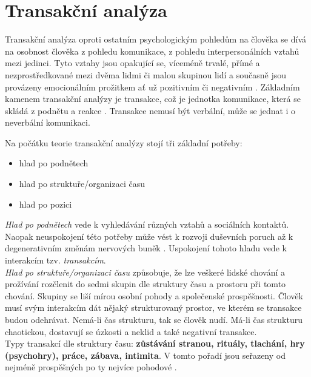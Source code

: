 \chapter{Transakční analýza}

Transakční analýza oproti ostatním psychologickým pohledům na
člověka se dívá na osobnost člověka z pohledu komunikace, 
z pohledu interpersonálních vztahů mezi jedinci. 
Tyto vztahy jsou opakující se, víceméně trvalé, přímé a 
nezprostředkované mezi dvěma lidmi či malou skupinou lidí a 
současně jsou provázeny emocionálním prožitkem ať už pozitivním či negativním \cite{interpersonalni_vztahy_slovnik}. Základním kamenem transakční analýzy je transakce, což je jednotka komunikace, která se skládá z podnětu a reakce \cite{transakcni_analyza_cata}. Transakce nemusí být verbální, může se jednat i o neverbální komunikaci.

Na počátku teorie transakční analýzy stojí tři základní potřeby:

    \begin{itemize}
        \item hlad po podnětech
        \item hlad po struktuře/organizaci času
        \item hlad po pozici
    \end{itemize}
    
{\it Hlad po podnětech} vede k vyhledávání různých vztahů a sociálních kontaktů. 
Naopak neuspokojení této potřeby může vést k rozvoji duševních poruch až k degenerativním změnám nervových buněk \cite{jak_si_lide_hraji}. 
Uspokojení tohoto hladu vede k interakcím tzv. {\it transakcím}.\\

{\it Hlad po struktuře/organizaci času} způsobuje, že lze veškeré lidské chování a prožívání rozčlenit do sedmi skupin dle struktury času a prostoru při tomto chování. 
Skupiny se liší mírou osobní pohody a společenské prospěšnosti. 
Člověk musí svým interakcím dát nějaký strukturovaný prostor, ve kterém se transakce budou odehrávat. 
Nemá-li čas strukturu, tak se člověk nudí. 
Má-li čas strukturu chaotickou, dostavují se úzkosti a neklid a také negativní transakce.\\

Typy transakcí dle struktury času: \textbf{zůstávání stranou, rituály, tlachání, hry (psychohry), práce, zábava, intimita}. V tomto pořadí jsou seřazeny od nejméně prospěšných po ty nejvíce pohodové \cite{translacni_analyza_prirucka}.\\

